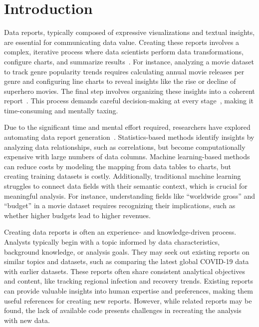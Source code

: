 \section{Introduction}

Data reports, typically composed of expressive visualizations and textual insights, are essential for communicating data value. Creating these reports involves a complex, iterative process where data scientists perform data transformations, configure charts, and summarize results~\cite{behrens1997principles, subramanian2020tractus}. For instance, analyzing a movie dataset to track genre popularity trends requires calculating annual movie releases per genre and configuring line charts to reveal insights like the rise or decline of superhero movies. The final step involves organizing these insights into a coherent report~\cite{li2023wherearewesofar}. This process demands careful decision-making at every stage~\cite{zhao2020chartseer, wongsuphasawat2017voyager, battle2019characterizing}, making it time-consuming and mentally taxing.

Due to the significant time and mental effort required, researchers have explored automating data report generation~\cite{shi2020calliope, wang2019datashot}. Statistics-based methods identify insights by analyzing data relationships, such as correlations, but become computationally expensive with large numbers of data columns. Machine learning-based methods can reduce costs by modeling the mapping from data tables to charts, but creating training datasets is costly. Additionally, traditional machine learning struggles to connect data fields with their semantic context, which is crucial for meaningful analysis. For instance, understanding fields like ``worldwide gross'' and ``budget'' in a movie dataset requires recognizing their implications, such as whether higher budgets lead to higher revenues.

Creating data reports is often an experience- and knowledge-driven process. Analysts typically begin with a topic informed by data characteristics, background knowledge, or analysis goals. They may seek out existing reports on similar topics and datasets, such as comparing the latest global COVID-19 data with earlier datasets. These reports often share consistent analytical objectives and content, like tracking regional infection and recovery trends. Existing reports can provide valuable insights into human expertise and preferences, making them useful references for creating new reports. However, while related reports may be found, the lack of available code presents challenges in recreating the analysis with new data.


